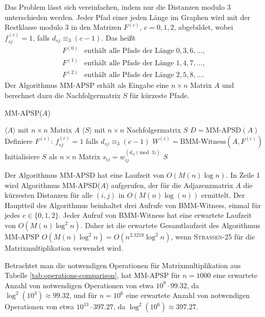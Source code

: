 \documentclass{scrartcl}
\numberwithin{equation}{section}
\begin{document}
Das Problem lässt sich vereinfachen, indem nur die Distanzen modulo 3 unterschieden werden. Jeder Pfad einer jeden Länge im Graphen wird mit der Restklasse modulo 3 in den Matrizen $F^{(c)}$, $c = 0, 1, 2$, abgebildet, wobei $f_{sj}^{(c)}=1$, falls $d_{sj} \equiv_3 (c-1)$. Das heißt
\begin{align*}
	F^{(0)} & \text{enthält alle Pfade der Länge } 0, 3, 6, \ldots, \\
	F^{(1)} & \text{enthält alle Pfade der Länge } 1, 4, 7, \ldots, \\
	F^{(2)} & \text{enthält alle Pfade der Länge } 2, 5, 8, \ldots.
\end{align*}
Der Algorithmus MM-APSP erhält als Eingabe eine $n \times n$ Matrix $A$ und berechnet dazu die Nachfolgermatrix $S$ für kürzeste Pfade.
\begin{algorithm}
	\caption{MM-APSP($A$)}
	\begin{algorithmic}[1]
		\Require $\langle A \rangle$ mit $n \times n$ Matrix $A$
		\Ensure $\langle S \rangle$ mit $n \times n$ Nachfolgermatrix $S$
		\State $D = \text{MM-APSD}(A)$ 
		\State Definiere $F^{(c)}$: $f_{sj}^{(c)}=1$ falls $d_{sj} \equiv_3 (c-1)$
		\State $W^{(c)} = \text{BMM-Witness}(A, F^{(c)})$ 
		\EndFor
		\State Initialisiere $S$ als $n \times n$ Matrix
		\State $s_{ij} = w_{ij}^{(d_{ij} \pmod 3)}$ 
		\EndFor
		\State \Return $S$
	\end{algorithmic}
\end{algorithm}
Der Algorithmus MM-APSD hat eine Laufzeit von $O(M(n) \log n)$. In Zeile 1 wird Algorithmus MM-APSD($A$) aufgerufen, der für die Adjazenzmatrix $A$ die kürzesten Distanzen für alle $(i, j)$ in $O(M(n) \log(n))$ ermittelt. Der Hauptteil des Algorithmus beinhaltet drei Aufrufe von BMM-Witness, einmal für jedes $c \in \{0, 1, 2\}$. Jeder Aufruf von BMM-Witness hat eine erwartete Laufzeit von $O(M(n) \log^2 n)$. Daher ist die erwartete Gesamtlaufzeit des Algorithmus MM-APSP $O(M(n) \log^2 n) = O(n^{2.3219} \log^2 n)$, wenn \textsc{Strassen-25} für die Matrixmultiplikation verwendet wird.

Betrachtet man die notwendigen Operationen für Matrixmultiplikation aus Tabelle \ref{tab:operations-comparison}, hat MM-APSP für $n = 1000$ eine erwartete Anzahl von notwendigen Operationen von etwa $10^9 \cdot 99.32$, da $\log^2(10^3) \approx 99.32$, und für $n = 10^6$ eine erwartete Anzahl von notwendigen Operationen von etwa $10^{13} \cdot 397.27$, da $\log^2(10^{6}) \approx 397.27$.
\end{document}
